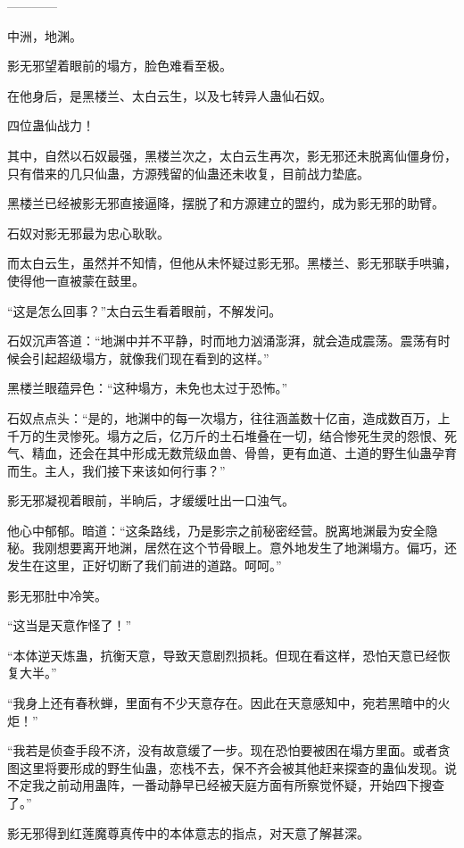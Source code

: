 
\begin{this_body}

------------

中洲，地渊。

影无邪望着眼前的塌方，脸色难看至极。

在他身后，是黑楼兰、太白云生，以及七转异人蛊仙石奴。

四位蛊仙战力！

其中，自然以石奴最强，黑楼兰次之，太白云生再次，影无邪还未脱离仙僵身份，只有借来的几只仙蛊，方源残留的仙蛊还未收复，目前战力垫底。

黑楼兰已经被影无邪直接逼降，摆脱了和方源建立的盟约，成为影无邪的助臂。

石奴对影无邪最为忠心耿耿。

而太白云生，虽然并不知情，但他从未怀疑过影无邪。黑楼兰、影无邪联手哄骗，使得他一直被蒙在鼓里。

“这是怎么回事？”太白云生看着眼前，不解发问。

石奴沉声答道：“地渊中并不平静，时而地力汹涌澎湃，就会造成震荡。震荡有时候会引起超级塌方，就像我们现在看到的这样。”

黑楼兰眼蕴异色：“这种塌方，未免也太过于恐怖。”

石奴点点头：“是的，地渊中的每一次塌方，往往涵盖数十亿亩，造成数百万，上千万的生灵惨死。塌方之后，亿万斤的土石堆叠在一切，结合惨死生灵的怨恨、死气、精血，还会在其中形成无数荒级血兽、骨兽，更有血道、土道的野生仙蛊孕育而生。主人，我们接下来该如何行事？”

影无邪凝视着眼前，半晌后，才缓缓吐出一口浊气。

他心中郁郁。暗道：“这条路线，乃是影宗之前秘密经营。脱离地渊最为安全隐秘。我刚想要离开地渊，居然在这个节骨眼上。意外地发生了地渊塌方。偏巧，还发生在这里，正好切断了我们前进的道路。呵呵。”

影无邪肚中冷笑。

“这当是天意作怪了！”

“本体逆天炼蛊，抗衡天意，导致天意剧烈损耗。但现在看这样，恐怕天意已经恢复大半。”

“我身上还有春秋蝉，里面有不少天意存在。因此在天意感知中，宛若黑暗中的火炬！”

“我若是侦查手段不济，没有故意缓了一步。现在恐怕要被困在塌方里面。或者贪图这里将要形成的野生仙蛊，恋栈不去，保不齐会被其他赶来探查的蛊仙发现。说不定我之前动用蛊阵，一番动静早已经被天庭方面有所察觉怀疑，开始四下搜查了。”

影无邪得到红莲魔尊真传中的本体意志的指点，对天意了解甚深。


\end{this_body}
